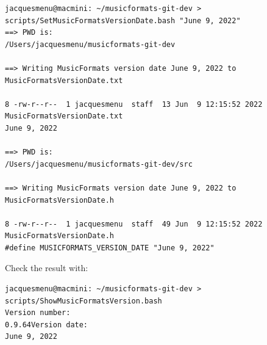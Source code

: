 \begin{enumerate}
\begin{lstlisting}[language=Terminal]
jacquesmenu@macmini: ~/musicformats-git-dev > scripts/SetMusicFormatsVersionDate.bash "June 9, 2022"
==> PWD is:
/Users/jacquesmenu/musicformats-git-dev

==> Writing MusicFormats version date June 9, 2022 to MusicFormatsVersionDate.txt

8 -rw-r--r--  1 jacquesmenu  staff  13 Jun  9 12:15:52 2022 MusicFormatsVersionDate.txt
June 9, 2022

==> PWD is:
/Users/jacquesmenu/musicformats-git-dev/src

==> Writing MusicFormats version date June 9, 2022 to MusicFormatsVersionDate.h

8 -rw-r--r--  1 jacquesmenu  staff  49 Jun  9 12:15:52 2022 MusicFormatsVersionDate.h
#define MUSICFORMATS_VERSION_DATE "June 9, 2022"
\end{lstlisting}

Check the result with:
\begin{lstlisting}[language=Terminal]
jacquesmenu@macmini: ~/musicformats-git-dev > scripts/ShowMusicFormatsVersion.bash 
Version number:
0.9.64Version date:
June 9, 2022
\end{lstlisting}

\end{enumerate}
